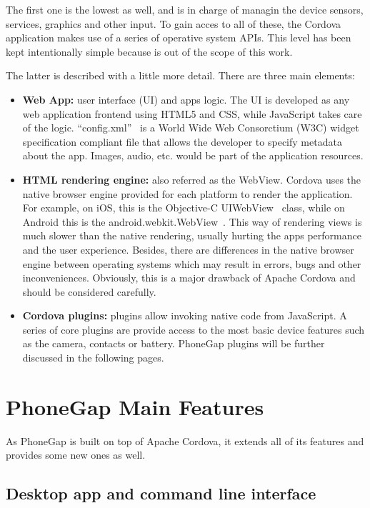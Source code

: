 The first one is the lowest as well, and is in charge of managin the device sensors, services, graphics and other input. To gain acces to all of these, the Cordova application makes use of a series of operative system APIs. This level has been kept intentionally simple because is out of the scope of this work.

The latter is described with a little more detail. There are three main elements: 

\begin{itemize} 
 \item \textbf{Web App:} user interface (UI) and apps logic. The UI is developed as any web application frontend using HTML5 and CSS, while JavaScript takes care of the logic. ``config.xml''~\cite{config.xml} is a World Wide Web Consorctium (W3C) widget specification compliant file that allows the developer to specify metadata about the app. Images, audio, etc. would be part of the application resources.
 \item \textbf{HTML rendering engine:} also referred as the WebView. Cordova uses the native browser engine provided for each platform to render the application. For example, on iOS, this is the Objective-C UIWebView~\cite{ioswebview} class, while on Android this is the android.webkit.WebView~\cite{androidwebview}. This way of rendering views is much slower than the native rendering, usually hurting the apps performance and the user experience. Besides, there are differences in the native browser engine between operating systems which may result in errors, bugs and other inconveniences. Obviously, this is a major drawback of Apache Cordova and should be considered carefully. 
 \item \textbf{Cordova plugins:} plugins allow invoking native code from JavaScript. A series of core plugins are provide access to the most basic device features such as the camera, contacts or battery. PhoneGap plugins will be further discussed in the following pages.
\end{itemize}

\section{PhoneGap Main Features}

As PhoneGap is built on top of Apache Cordova, it extends all of its features and provides some new ones as well.

\subsection{Desktop app and command line interface}

